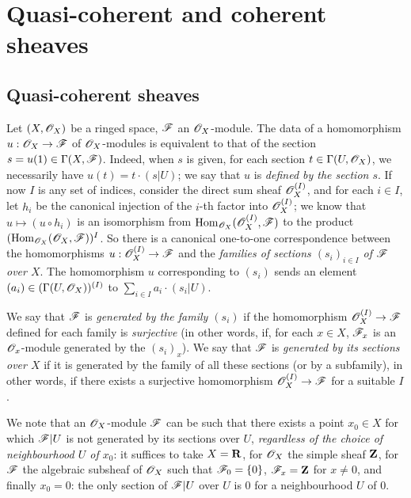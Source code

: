 \section{Quasi-coherent and coherent sheaves}
\label{section:0.5}

\subsection{Quasi-coherent sheaves}
\label{subsection:0.5.1}

\begin{env}[5.1.1]
\label{0.5.1.1}
Let $(X,\mathscr{O}_X)$ be a ringed space, $\mathscr{F}$ an $\mathscr{O}_X$-module.
The data of a homomorphism $u:\sh{O}_X\to\sh{F}$ of $\mathscr{O}_X$-modules is equivalent to that of the section $s=u(1)\in\Gamma(X,\mathscr{F})$.
Indeed, when $s$ is given, for each section $t\in\Gamma(U,\mathscr{O}_X)$, we necessarily have $u(t)=t\cdot(s|U)$;
we say that $u$ is \emph{defined by the section $s$}.
If now $I$ is any set of indices, consider the direct sum sheaf $\mathscr{O}_X^{(I)}$, and for each $i\in I$, let $h_i$ be the canonical injection of the $i$-th factor into $\mathscr{O}_X^{(I)}$;
we know that $u\mapsto(u\circ h_i)$ is an isomorphism from $\operatorname{Hom}_{\mathscr{O}_X}(\mathscr{O}_X^{(I)},\mathscr{F})$ to the product $(\operatorname{Hom}_{\mathscr{O}_X}(\mathscr{O}_X,\mathscr{F}))^I$.
So there is a canonical one-to-one correspondence between the homomorphisms $u:\sh{O}_X^{(I)}\to\sh{F}$ and the \emph{families of sections $(s_i)_{i\in I}$ of $\mathscr{F}$ over $X$}.
The homomorphism $u$ corresponding to $(s_i)$ sends an element $(a_i)\in(\Gamma(U,\mathscr{O}_X))^{(I)}$ to $\sum_{i\in I}a_i\cdot(s_i|U)$.

We say that $\mathscr{F}$ is \emph{generated by the family $(s_i)$} if the homomorphism $\sh{O}_X^{(I)}\to\sh{F}$ defined
for each family is \emph{surjective} (in other words, if, for each $x\in X$, $\mathscr{F}_x$ is an $\mathscr{O}_x$-module generated by the $(s_i)_x$).
We say that $\mathscr{F}$ is \emph{generated by its sections over $X$} if it is generated by the family of all these sections (or by a subfamily), in other words, if there exists a surjective homomorphism $\sh{O}_X^{(I)}\to\sh{F}$ for a suitable $I$.

We note that an $\mathscr{O}_X$-module $\mathscr{F}$ can be such that there exists a point $x_0\in X$ for which $\mathscr{F}|U$ is not generated by its sections over $U$, \emph{regardless of the choice of neighbourhood $U$ of $x_0$}:
it suffices to take $X=\mathbf{R}$, for $\mathscr{O}_X$ the simple sheaf $\mathbf{Z}$, for $\mathscr{F}$ the algebraic subsheaf of $\mathscr{O}_X$ such that $\mathscr{F}_0=\{0\}$, $\mathscr{F}_x=\mathbf{Z}$ for $x\neq 0$, and finally $x_0=0$:
the only section of $\mathscr{F}|U$ over $U$ is $0$ for a neighbourhood $U$ of $0$.
\end{env}

